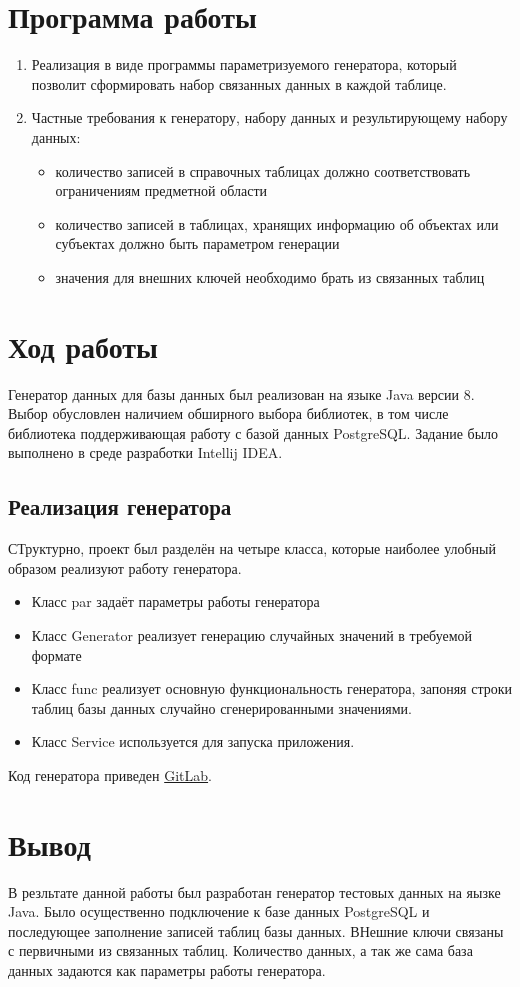\documentclass[a4paper,14pt]{extarticle}
\begin{document}
\section{Программа работы}
\begin{enumerate}
\item Реализация в виде программы параметризуемого генератора, который позволит сформировать набор связанных данных в каждой таблице.
\item Частные требования к генератору, набору данных и результирующему набору данных:
\begin{itemize}
\item количество записей в справочных таблицах должно соответствовать ограничениям предметной области
\item количество записей в таблицах, хранящих информацию об объектах или субъектах должно быть параметром генерации
\item значения для внешних ключей необходимо брать из связанных таблиц
\end{itemize}
\end{enumerate}


\section{Ход работы}
Генератор данных для базы данных был реализован на языке Java версии 8. Выбор обусловлен наличием обширного выбора библиотек, в том числе библиотека поддерживающая работу с базой данных PostgreSQL. Задание было выполнено в среде разработки Intellij IDEA.

\subsection{Реализация генератора}
СТруктурно, проект был разделён на четыре класса, которые наиболее улобный образом реализуют работу генератора.
\begin{itemize}
\item Класс par задаёт параметры работы генератора
\item Класс Generator реализует генерацию случайных значений в требуемой формате
\item Класс func реализует основную функциональность генератора, запоняя строки таблиц базы данных случайно сгенерированными значениями.
\item Класс Service используется для запуска приложения.
\end{itemize}

Код генератора приведен \href{http://gitlab.icc.spbstu.ru/IvanKrylov/video-games-store/tree/master}{GitLab}.


\section{Вывод}
В резльтате данной работы был разработан генератор тестовых данных на яызке Java. Было осущественно подключение к базе данных PostgreSQL и последующее заполнение записей таблиц базы данных. ВНешние ключи связаны с первичными из связанных таблиц. Количество данных, а так же сама база данных задаются как параметры работы генератора.
\end{document}
